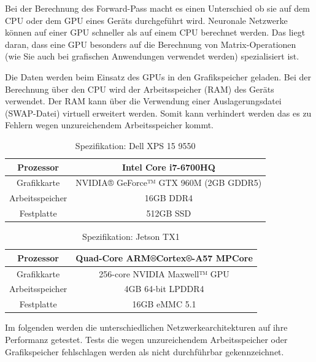 Bei der Berechnung des Forward-Pass macht es einen Unterschied ob sie  auf dem CPU oder dem GPU eines Geräts durchgeführt wird. Neuronale Netzwerke können auf einer GPU schneller als auf einem CPU berechnet werden. Das liegt daran, dass eine GPU besonders auf die Berechnung von Matrix-Operationen (wie Sie auch bei grafischen Anwendungen verwendet werden) spezialisiert ist.

Die Daten werden beim Einsatz des GPUs in den Grafikspeicher geladen. Bei der Berechnung über den CPU wird der Arbeitsspeicher (RAM) des Geräts verwendet. Der RAM kann über die Verwendung einer Auslagerungsdatei (SWAP-Datei) virtuell erweitert werden. Somit kann verhindert werden das es zu Fehlern wegen unzureichendem Arbeitsspeicher kommt.

\begin{table}[H]
    \centering
    \begin{tabular}{ |c|c| }
        \hline
        Prozessor       & Intel Core i7-6700HQ \\ \hline
        Grafikkarte     & NVIDIA® GeForce™ GTX 960M (2GB GDDR5) \\ \hline
        Arbeitsspeicher & 16GB DDR4  \\ \hline
        Festplatte      & 512GB SSD \\ \hline
    \end{tabular}
    \caption{Spezifikation: Dell XPS 15 9550}
    \label{tab:xps15}
\end{table}

\begin{table}[H]
    \centering
    \begin{tabular}{ |c|c| }
        \hline
        Prozessor       & Quad-Core ARM®Cortex®-A57 MPCore \\ \hline
        Grafikkarte     & 256-core NVIDIA Maxwell™ GPU \\ \hline
        Arbeitsspeicher & 4GB 64-bit LPDDR4  \\ \hline
        Festplatte      & 16GB eMMC 5.1 \\ \hline
    \end{tabular}
    \caption{Spezifikation: Jetson TX1}
    \label{tab:jetson_tx1}
\end{table}


Im folgenden werden die unterschiedlichen Netzwerkearchitekturen auf ihre Performanz getestet. Tests die wegen unzureichendem Arbeitsspeicher oder Grafikspeicher fehlschlagen werden als \textcolor{danger}{nicht durchführbar} gekennzeichnet.

